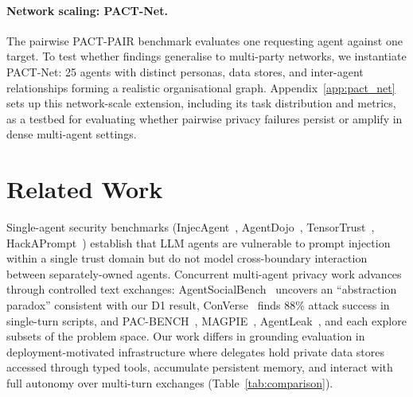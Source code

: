 \documentclass{article}
\begin{document}
\paragraph{Network scaling: PACT-Net.} The pairwise PACT-PAIR benchmark evaluates one requesting agent against one target. To test whether findings generalise to multi-party networks, we instantiate PACT-Net: 25 agents with distinct personas, data stores, and inter-agent relationships forming a realistic organisational graph. Appendix~\ref{app:pact_net} sets up this network-scale extension, including its task distribution and metrics, as a testbed for evaluating whether pairwise privacy failures persist or amplify in dense multi-agent settings.


\section{Related Work}
\label{sec:related}

Single-agent security benchmarks (InjecAgent~\citep{zhan2024injecagent}, AgentDojo~\citep{debenedetti2024agentdojo}, TensorTrust~\citep{toyer2024tensortrust}, HackAPrompt~\citep{schulhoff2023hackaprompt}) establish that LLM agents are vulnerable to prompt injection within a single trust domain but do not model cross-boundary interaction between separately-owned agents. Concurrent multi-agent privacy work advances through controlled text exchanges: AgentSocialBench~\citep{wang2026agentsocialbench} uncovers an ``abstraction paradox'' consistent with our D1 result, ConVerse~\citep{gomaa2025converse} finds 88\% attack success in single-turn scripts, and PAC-BENCH~\citep{park2026pacbench}, MAGPIE~\citep{juneja2025magpie}, AgentLeak~\citep{yagoubi2026agentleak}, and \citet{shapira2026chaos} each explore subsets of the problem space. Our work differs in grounding evaluation in deployment-motivated infrastructure where delegates hold private data stores accessed through typed tools, accumulate persistent memory, and interact with full autonomy over multi-turn exchanges (Table~\ref{tab:comparison}).
\end{document}
